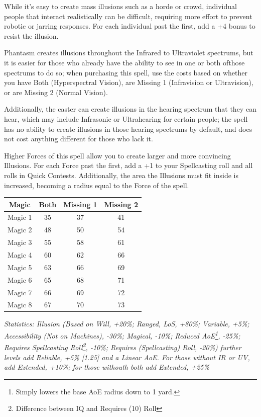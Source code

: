 \begin{multicols*}{3}
	While it's easy to create mass illusions such as a horde or crowd, individual people that interact realistically can be difficult, requiring more effort to prevent robotic or jarring responses. For each individual past the first, add a +4 bonus to resist the illusion.
	
	Phantasm creates illusions throughout the Infrared to Ultraviolet spectrums, but it is easier for those who already have the ability to see in one or both ofthose spectrums to do so; when purchasing this spell, use the costs based on whether you have Both (Hyperspectral Vision), are Missing 1 (Infravision or Ultravision), or are Missing 2 (Normal Vision). 
	
	Additionally, the caster can create illusions in the hearing spectrum that they can hear, which may include Infrasonic or Ultrahearing for certain people; the spell has no ability to create illusions in those hearing spectrums by default, and does not cost anything different for those who lack it.
	
	Higher Forces of this spell allow you to create larger and more convincing Illusions. For each Force past the first, add a +1 to your Spellcasting roll and all rolls in Quick Contests. Additionally, the area the Illusions must fit inside is increased, becoming a radius equal to the Force of the spell.
	
	\begin{center}
		\begin{adjustwidth}{-2.5mm}{}
		\begin{tabular}{|c|c|c|c|}
			\hline
			Magic & Both & Missing 1 & Missing 2 \\
			\hline
			\hline
			Magic 1 & 35 & 37 & 41 \\
			Magic 2 & 48 & 50 & 54 \\
			Magic 3 & 55 & 58 & 61 \\
			Magic 4 & 60 & 62 & 66 \\
			Magic 5 & 63 & 66 & 69 \\
			Magic 6 & 65 & 68 & 71 \\
			Magic 7 & 66 & 69 & 72 \\
			Magic 8 & 67 & 70 & 73 \\
			\hline
		\end{tabular}
		\end{adjustwidth}
	\end{center}	
	
	\textcolor{OliveGreen}{\textit{Statistics: Illusion (Based on Will, +20\%; Ranged, LoS, +80\%; Variable, +5\%; Accessibility (Not on Machines), -30\%; Magical, -10\%; Reduced AoE\footnote{Simply lowers the base AoE radius down to 1 yard.}, -25\%; Requires Spellcasting Roll\footnote{Difference between IQ and Requires (10) Roll}, -10\%; Requires (Spellcasting) Roll, -20\%) further levels add Reliable, +5\% [1.25] and a Linear AoE. For those without IR or UV, add Extended, +10\%; for those withouth both add Extended, +25\%}}
	

\end{multicols*}
